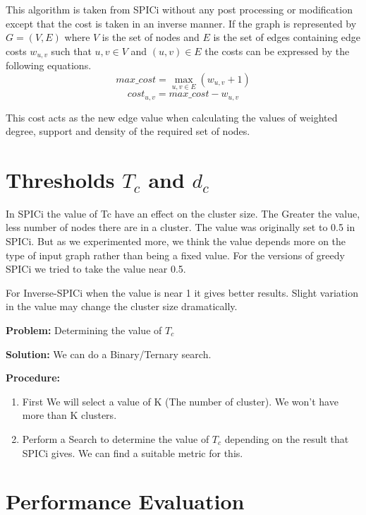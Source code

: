 \documentclass[8pt]{extarticle}
\begin{document}
	This algorithm is taken from SPICi without any post processing or modification except that the cost is taken in an inverse manner. If the graph is represented by $G=(V,E)$ where $V$ is the set of nodes and $E$ is the set of edges containing edge costs $w_{u,v}$ such that $u,v\in V$ and $(u,v)\in E$ the costs can be expressed by the following equations.
	\begin{equation}
	max\_cost = \max_{u,v\in E}(w_{u,v}+1)
	\end{equation}
	\begin{equation}
	cost_{u,v} = max\_cost - w_{u,v}
	\end{equation}
	
	This cost acts as the new edge value when calculating the values of weighted degree, support and density of the required set of nodes.
	
	\section{Thresholds $T_c$ and $d_c$}
	In SPICi the value of Tc have an effect on the cluster size. The Greater the value, less number of nodes there are in a cluster. The value was originally set to 0.5 in SPICi.
	But as we experimented more, we think the value depends more on the type of input graph rather than being a fixed value. For the versions of greedy SPICi we tried to take the value near 0.5.
	
	For Inverse-SPICi when the value is near 1 it gives better results. Slight variation in the value may change the cluster size dramatically. 
	
	\textbf{Problem:} Determining the value of $T_c$
	
	
	\textbf{Solution:} We can do a Binary/Ternary search.
	
	\textbf{Procedure:} 
	\begin{enumerate}
		\item First We will select a value of K (The number of cluster). We won't have more than K clusters.
		\item Perform a Search to determine the value of $T_c$ depending on the result that SPICi gives. We can find a suitable metric for this.
	\end{enumerate}
	 
	\section{Performance Evaluation}
	
\end{document}
